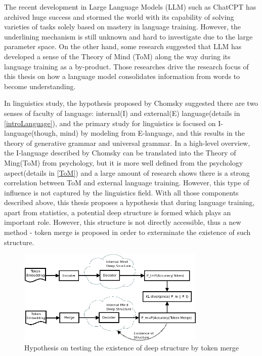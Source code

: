 \documentclass[12pt]{article}
\begin{document}
The recent development in Large Language Models (LLM) such as ChatCPT has archived huge success and stormed the world  with its capability of solving varieties of tasks solely based on mastery in language training\cite{Bubeck_2023}. However, the underlining mechanism is still unknown and hard to investigate due to the large parameter space. On the other hand, some research\cite{Kosinski_2023} suggested that LLM has developed a sense of the Theory of Mind (ToM) along the way during its language training as a by-product. Those researches drive the research focus of this thesis on how a language model consolidates information from words to become understanding.

In linguistics study, the hypothesis proposed by Chomsky\cite{Hauser_2002} suggested there are two senses of faculty of language: internal(I) and external(E) language(details in \ref{introLanguage}), and the primary study for linguistics is focused on I-language(though, mind) by modeling from E-language, and this results in the theory of generative grammar and universal grammar. In a high-level overview, the I-language described by Chomsky can be translated into the Theory of Ming(ToM) from psychology, but it is more well defined from the psychology aspect(details in \ref{ToM}) and a large amount of research shows there is a strong correlation between ToM and external language training. However, this type of influence is not captured by the linguistics field. With all those components described above, this thesis proposes a hypothesis that during language training, apart from statistics, a potential deep structure is formed which plays an important role. However, this structure is not directly accessible, thus a new method - token merge is proposed in order to exterminate the existence of such structure. 
\begin{figure} [!h]
\begin{center}
\includegraphics[width=0.8\textwidth]{figures/generalview1.png}
\caption{Hypothesis on testing the existence of deep structure by token merge} 
\label{fig:LLMhypothesis}
\end{center}
\end{figure}
\end{document}
